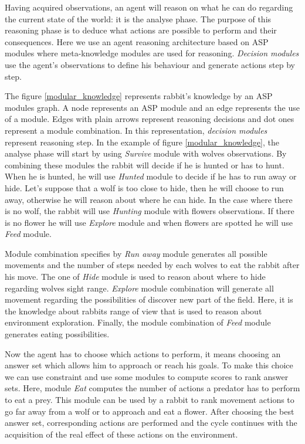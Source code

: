 \documentclass{aamas2012}
\begin{document}
	Having acquired observations, an agent will reason on what he can do regarding the current state of the world: it is the analyse phase.
	The purpose of this reasoning phase is to deduce what actions are possible to perform and their consequences.
	Here we use an agent reasoning architecture based on ASP modules where meta-knowledge modules are used for reasoning.
	\emph{Decision modules} use the agent's observations to define his behaviour and generate actions step by step.
	
	The figure \ref{modular_knowledge} represents rabbit's knowledge by an ASP modules graph.
	A node represents an ASP module and an edge represents the use of a module.
	Edges with plain arrows represent reasoning decisions and dot ones represent a module combination.
	In this representation, \emph{decision modules} represent reasoning step.
	In the example of figure \ref{modular_knowledge}, the analyse phase will start by using \emph{Survive} module with wolves observations.
	By combining these modules the rabbit will decide if he is hunted or has to hunt.
	When he is hunted, he will use \emph{Hunted} module to decide if he has to run away or hide.
	Let's suppose that a wolf is too close to hide, then he will choose to run away, otherwise he will reason about where he can hide.
	In the case where there is no wolf, the rabbit will use \emph{Hunting} module with flowers observations.
	If there is no flower he will use \emph{Explore} module and when flowers are spotted he will use \emph{Feed} module.
	
	Module combination specifies by \emph{Run away} module generates all possible movements and the number of steps needed by each wolves to eat the rabbit after his move.
	The one of \emph{Hide} module is used to reason about where to hide regarding wolves sight range. 
	\emph{Explore} module combination will generate all movement regarding the possibilities of discover new part of the field.
	Here, it is the knowledge about rabbits range of view that is used to reason about environment exploration.
	Finally, the module combination of \emph{Feed} module generates eating possibilities.
	
	Now the agent has to choose which actions to perform, it means choosing an answer set which allows him to approach or reach his goals.
	To make this choice we can use constraint and use some modules to compute scores to rank answer sets.
	Here, module \emph{Eat} computes the number of actions a predator has to perform to eat a prey.
	This module can be used by a rabbit to rank movement actions to go far away from a wolf or to approach and eat a flower.
	After choosing the best answer set, corresponding actions are performed and 
	the cycle continues with the acquisition of the real effect of these actions on the environment.
\end{document}

